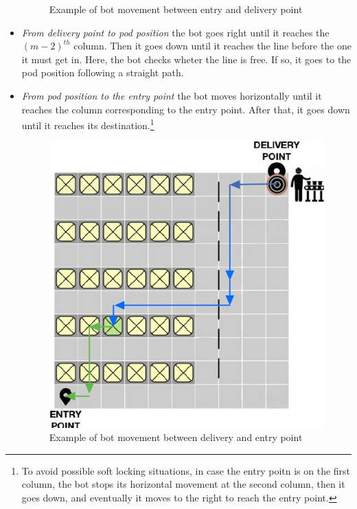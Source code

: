 \documentclass[10pt,a4paper]{article}
\begin{document}
\begin{itemize}
\begin{figure}[ht]
						\caption{Example of bot movement between entry and delivery point}
					\end{figure}
					\item \emph{From delivery point to pod position} the bot goes right until it reaches the ${(m-2)}^{th}$ column. Then it goes down until it reaches the line before the one it must get in. Here, the bot checks wheter the line is free. If so, it goes to the pod position following a straight path.
					\item \emph{From pod position to the entry point} the bot moves horizontally until it reaches the column corresponding to the entry point. After that, it goes down until it reaches its destination.\footnote{To avoid possible soft locking situations, in case the entry poitn is on the first column, the bot stops its horizontal movement at the second column, then it goes down, and eventually it moves to the right to reach the entry point.}
					\begin{figure}[ht]
						\centering
						\includegraphics[scale = 0.36]{Images/BotMovement2.JPG}
						\caption{Example of bot movement between delivery and entry point}
					\end{figure}
				\end{itemize}
		
\end{document}

